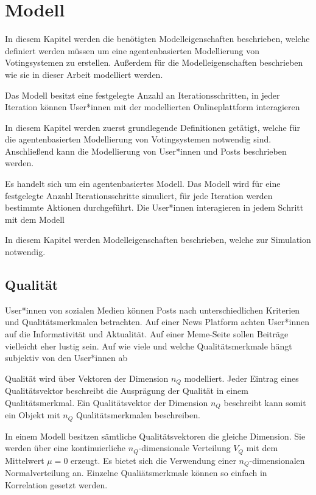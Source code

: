 \chapter{Modell}

In diesem Kapitel werden die benötigten Modelleigenschaften beschrieben, welche definiert werden müssen um eine agentenbasierten Modellierung von Votingsystemen zu erstellen. Außerdem für die Modelleigenschaften beschrieben wie sie in dieser Arbeit modelliert werden.

Das Modell besitzt eine festgelegte Anzahl an Iterationsschritten, in jeder Iteration können User*innen mit der modellierten Onlineplattform interagieren

In diesem Kapitel werden zuerst grundlegende Definitionen getätigt, welche für die agentenbasierten Modellierung von Votingsystemen notwendig sind. Anschließend kann die Modellierung von User*innen und Posts beschrieben werden. 

Es handelt sich um ein agentenbasiertes Modell. Das Modell wird für eine festgelegte Anzahl Iterationsschritte simuliert, für jede Iteration werden bestimmte Aktionen durchgeführt. Die User*innen interagieren in jedem Schritt mit dem Modell

In diesem Kapitel werden Modelleigenschaften beschrieben, welche zur Simulation notwendig.

\section{Qualität} %

User*innen von sozialen Medien können Posts nach unterschiedlichen Kriterien und Qualitätsmerkmalen betrachten. Auf einer News Platform achten User*innen auf die Informativität und Aktualität. Auf einer Meme-Seite sollen Beiträge vielleicht eher lustig sein. Auf wie viele und welche Qualitätsmerkmale hängt subjektiv von den User*innen ab

Qualität wird über Vektoren der Dimension $n_Q$ modelliert. Jeder Eintrag eines Qualitätsvektor beschreibt die Ausprägung der Qualität in einem Qualitätsmerkmal. Ein Qualitätsvektor der Dimension $n_Q$ beschreibt kann somit ein Objekt mit $n_Q$ Qualitätsmerkmalen beschreiben. 

In einem Modell besitzen sämtliche Qualitätsvektoren die gleiche Dimension. Sie werden über eine kontinuierliche $n_Q$-dimensionale Verteilung $V_Q$ mit dem Mittelwert $\mu = 0$ erzeugt. Es bietet sich die Verwendung einer $n_Q$-dimensionalen Normalverteilung an. Einzelne Qualiätsmerkmale können so einfach in Korrelation gesetzt werden. 

